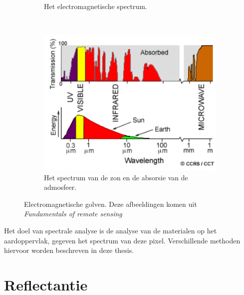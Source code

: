 \documentclass[12pt]{report}
\newcommand{\rulesep}{\unskip\ \vrule height -1ex\ }
\begin{document}
\begin{figure}
\begin{subfigure}[b]{0.2\textwidth}
\caption{Het electromagnetische spectrum. \label{fig:spec}}
\end{subfigure}\rulesep
\begin{subfigure}[b]{0.4\textwidth}
\includegraphics[width=\textwidth]{spec2.PNG}
\caption{Het spectrum van de zon en de absorsie van de admosfeer.\label{fig:specs}}
\end{subfigure}
\caption{Electromagnetische golven. Deze afbeeldingen komen uit \textit{Fundamentals of remote sensing\cite{fun}}\label{fig:rs2}}
\end{figure}


Het doel van spectrale analyse is de analyse van de materialen op het aardoppervlak, gegeven het spectrum van deze pixel. Verschillende methoden hiervoor worden beschreven in deze thesis. 

\section{Reflectantie} \label{sec:ref}

\end{document}
